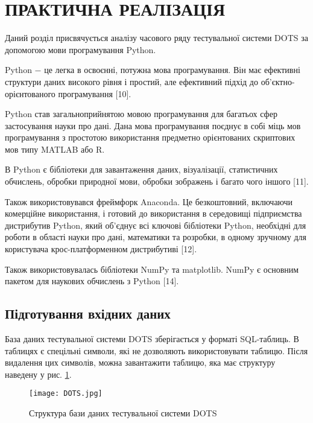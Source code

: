 \section{ПРАКТИЧНА РЕАЛІЗАЦІЯ}

Даний розділ присвячується аналізу часового ряду тестувальної системи DOTS за допомогою мови програмування Python. 

Python $-$ це легка в освоєнні, потужна мова програмування. Він має ефективні структури даних високого рівня і простий, але ефективний підхід до об'єктно-орієнтованого програмування [10].

Python став загальноприйнятою мовою програмування для багатьох сфер застосування науки про дані. Дана мова програмування поєднує в собі міць мов програмування з простотою використання предметно орієнтованих скриптових мов типу MATLAB або R. 

В Python є бібліотеки для завантаження даних, візуалізації, статистичних обчислень, обробки природної мови, обробки зображень і багато чого іншого [11].

Також використовувався фреймфорк Anaconda. Це безкоштовний, включаючи комерційне використання, і готовий до використання в середовищі підприємства дистрибутив Python, який об'єднує всі ключові бібліотеки Python, необхідні для роботи в області науки про дані, математики та розробки, в одному зручному для користувача крос-платформенном дистрибутиві [12].



Також використовувалась бібліотеки NumPy та matplotlib. NumPy є основним пакетом для наукових обчислень з Python [14].

\subsection{Підготування вхідних даних}

База даних тестувальної системи DOTS зберігається у форматі SQL-таблиць. В таблицях є спецільні символи, які не дозволяють використовувати таблицю. Після видалення цих символів, можна завантажити таблицю, яка має структуру наведену у рис. \ref{fig:DOTS}.

\vspace{1em}

\begin{figure}[h]
  \texttt{[image: DOTS.jpg]}
  \caption{Структура бази даних тестувальної системи DOTS}
  \label{fig:DOTS}
\end{figure}


